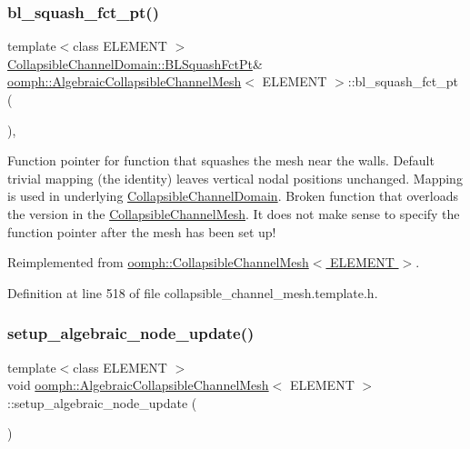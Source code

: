 \subsubsection{\texorpdfstring{bl\+\_\+squash\+\_\+fct\+\_\+pt()}{bl\_squash\_fct\_pt()}}
{\footnotesize\ttfamily template$<$class E\+L\+E\+M\+E\+NT $>$ \\
\hyperlink{classoomph_1_1CollapsibleChannelDomain_a2bf1d7943bfac134a5c27a54c7e1faed}{Collapsible\+Channel\+Domain\+::\+B\+L\+Squash\+Fct\+Pt}\& \hyperlink{classoomph_1_1AlgebraicCollapsibleChannelMesh}{oomph\+::\+Algebraic\+Collapsible\+Channel\+Mesh}$<$ E\+L\+E\+M\+E\+NT $>$\+::bl\+\_\+squash\+\_\+fct\+\_\+pt (\begin{DoxyParamCaption}{ }\end{DoxyParamCaption})\hspace{0.3cm}{\ttfamily [inline]}, {\ttfamily [virtual]}}



Function pointer for function that squashes the mesh near the walls. Default trivial mapping (the identity) leaves vertical nodal positions unchanged. Mapping is used in underlying \hyperlink{classoomph_1_1CollapsibleChannelDomain}{Collapsible\+Channel\+Domain}. Broken function that overloads the version in the \hyperlink{classoomph_1_1CollapsibleChannelMesh}{Collapsible\+Channel\+Mesh}. It does not make sense to specify the function pointer after the mesh has been set up! 



Reimplemented from \hyperlink{classoomph_1_1CollapsibleChannelMesh_aac6057b4e572cb47923570b5e9c781c4}{oomph\+::\+Collapsible\+Channel\+Mesh$<$ E\+L\+E\+M\+E\+N\+T $>$}.



Definition at line 518 of file collapsible\+\_\+channel\+\_\+mesh.\+template.\+h.

\mbox{\label{classoomph_1_1AlgebraicCollapsibleChannelMesh_a54e93316a561cd77a68c0774d2772030}} 
\subsubsection{\texorpdfstring{setup\+\_\+algebraic\+\_\+node\+\_\+update()}{setup\_algebraic\_node\_update()}}
{\footnotesize\ttfamily template$<$class E\+L\+E\+M\+E\+NT $>$ \\
void \hyperlink{classoomph_1_1AlgebraicCollapsibleChannelMesh}{oomph\+::\+Algebraic\+Collapsible\+Channel\+Mesh}$<$ E\+L\+E\+M\+E\+NT $>$\+::setup\+\_\+algebraic\+\_\+node\+\_\+update (\begin{DoxyParamCaption}{ }\end{DoxyParamCaption})\hspace{0.3cm}{\ttfamily [protected]}}



